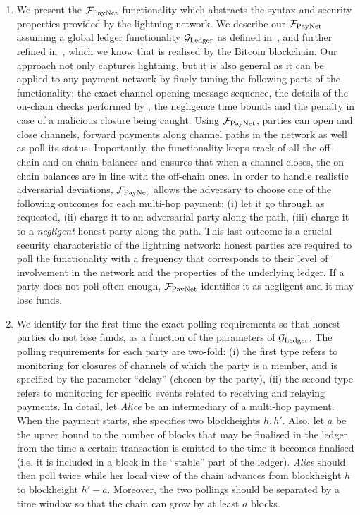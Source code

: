 \begin{enumerate}
\item We present the $\mathcal{F}_{\mathrm{PayNet}}{}$ functionality which abstracts the syntax and
security properties provided by the lightning network. We describe our
$\mathcal{F}_{\mathrm{PayNet}}{}$ assuming a global ledger functionality $\mathcal{G}_{\mathrm{Ledger}}$ as defined
in~\cite{BMTZ17}, and further refined in~\cite{genesis}, which we know that is
realised by the Bitcoin blockchain. Our approach not only captures lightning,
but it is also general as it can be applied to any payment network by finely
tuning the following parts of the functionality: the exact channel
opening message sequence, the details of the on-chain checks performed by
\fpaynet, the negligence time bounds and the penalty in case of a malicious
closure being caught. Using $\mathcal{F}_{\mathrm{PayNet}}{}$, parties can open and close channels,
forward payments along channel paths in the network as well as poll its status.
Importantly, the functionality keeps track of all the off-chain and on-chain
balances and ensures that when a channel closes, the on-chain balances
are in line with the off-chain ones. In order to handle
realistic adversarial deviations, $\mathcal{F}_{\mathrm{PayNet}}{}$ allows the
adversary to choose one of the following outcomes for each multi-hop
payment: (i) let it go through as requested, (ii) charge it to an adversarial
party along the path, (iii) charge it to a \emph{negligent} honest party along
the path. This last outcome is a crucial security characteristic of the
lightning network: honest parties are required to poll the
functionality with a frequency that corresponds to their level of
involvement in the network and the properties of the underlying ledger. If a
party does not poll often enough, $\mathcal{F}_{\mathrm{PayNet}}{}$ identifies it as
negligent and it may lose funds.

\item We identify for the first time the exact polling requirements so
that honest parties do not lose funds, as a function of the parameters
of $\mathcal{G}_{\mathrm{Ledger}}$. The polling requirements for each party are two-fold: (i) the
first type refers to monitoring for closures of channels of which the
party is a member, and is specified by the parameter ``$\mathrm{delay}$''
(chosen by the party), (ii) the second type refers to monitoring for
specific events related to receiving and relaying payments. In detail,
let \emph{Alice} be an intermediary of a multi-hop payment. When the payment
starts, she specifies two blockheights $h, h'$. Also, let $a$ be the upper bound
to the number of blocks that may be finalised in the ledger from the time a
certain transaction is emitted to the time it becomes finalised (i.e. it is
included in a block in the ``stable'' part of the ledger). \emph{Alice}
should then poll twice while her local view of the chain advances from
blockheight $h$ to blockheight $h' - a$. Moreover, the two pollings should be
separated by a time window so that the chain can grow by at least $a$
blocks.


\end{enumerate}
